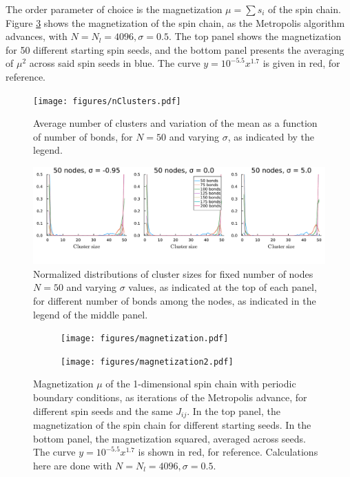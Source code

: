 The order parameter of choice is the magnetization $\mu = \sum s_i$ of the spin chain. Figure \ref{fig:magnetization} shows the magnetization of the spin chain, as the Metropolis algorithm advances, with $N = N_l = 4096, \sigma = 0.5$. The top panel shows the magnetization for 50 different starting spin seeds, and the bottom panel presents the averaging of $\mu^2$ across said spin seeds in blue. The curve  $y = 10^{-5.5} x^{1.7} $ is given in red, for reference.

\begin{figure}
	\centering
	\texttt{[image: figures/nClusters.pdf]}
	\caption{Average number of clusters and variation of the mean as a function of number of bonds, for $N=50$ and varying $\sigma$, as indicated by the legend.}
	\label{fig:nClusters}
\end{figure}

\begin{figure}
		\centering
		\includegraphics[width=\textwidth]{figures/clusterSizeDistribution.pdf}
	\caption{Normalized distributions of cluster sizes for fixed number of nodes $N=50$ and  varying $\sigma$ values, as indicated at the top of each panel, for different number of bonds among the nodes, as indicated in the legend of the middle panel.}
	\label{fig:clusterLengthDistribution}
\end{figure}
\begin{figure}[p]
	\centering
	\begin{subfigure}{0.8\textwidth}
	\texttt{[image: figures/magnetization.pdf]}
	\end{subfigure}
	\begin{subfigure}{0.8\textwidth}
	\texttt{[image: figures/magnetization2.pdf]}
	\end{subfigure}
	\caption{ Magnetization $\mu$ of the 1-dimensional spin chain with periodic boundary conditions, as iterations of the Metropolis advance, for different spin seeds and the same $J_{ij}$. In the top panel, the magnetization of the spin chain for different starting seeds. In the bottom panel, the magnetization squared, averaged across seeds. The curve $y=10^{-5.5} x^{1.7}$ is shown in red, for reference. Calculations here are done with $N = N_l = 4096, \sigma = 0.5.$}
	\label{fig:magnetization}
\end{figure}
